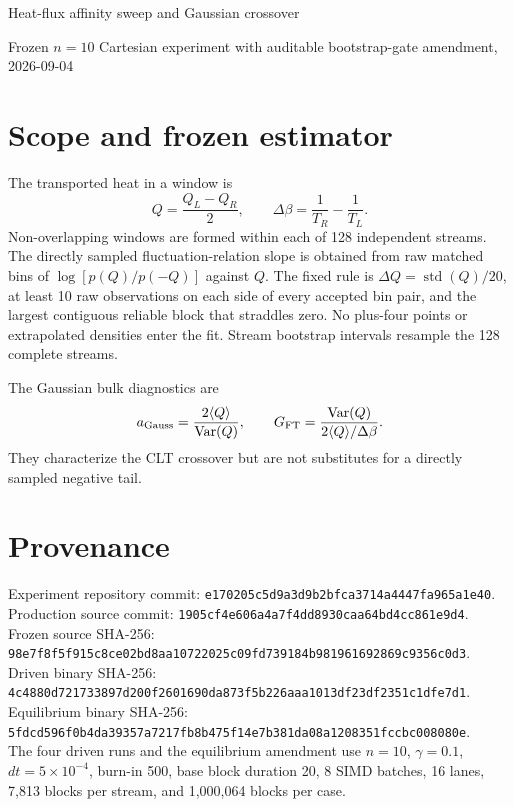 \documentclass[10pt]{article}
\begin{document}
\begin{center}
{\Large Heat-flux affinity sweep and Gaussian crossover}\par
\vspace{0.3em}
{\small Frozen $n=10$ Cartesian experiment with auditable bootstrap-gate amendment, 2026-09-04}
\end{center}

\section*{Scope and frozen estimator}
The transported heat in a window is
\[
Q=\frac{Q_L-Q_R}{2},\qquad
\Delta\beta=\frac{1}{T_R}-\frac{1}{T_L}.
\]
Non-overlapping windows are formed within each of 128 independent streams.
The directly sampled fluctuation-relation slope is obtained from raw matched
bins of $\log[p(Q)/p(-Q)]$ against $Q$.  The fixed rule is
$\Delta Q=\operatorname{std}(Q)/20$, at least 10 raw observations on each
side of every accepted bin pair, and the largest contiguous reliable block
that straddles zero.  No plus-four points or extrapolated densities enter the
fit.  Stream bootstrap intervals resample the 128 complete streams.

The Gaussian bulk diagnostics are
\[
a_{\rm Gauss}=\frac{2\langle Q\rangle}{\operatorname{Var}(Q)},\qquad
G_{\rm FT}=\frac{\operatorname{Var}(Q)}{2\langle Q\rangle/\Delta\beta}.
\]
They characterize the CLT crossover but are not substitutes for a directly
sampled negative tail.

\section*{Provenance}
Experiment repository commit: \nolinkurl{e170205c5d9a3d9b2bfca3714a4447fa965a1e40}.\\
Production source commit: \nolinkurl{1905cf4e606a4a7f4dd8930caa64bd4cc861e9d4}.\\
Frozen source SHA-256: \nolinkurl{98e7f8f5f915c8ce02bd8aa10722025c09fd739184b981961692869c9356c0d3}.\\
Driven binary SHA-256: \nolinkurl{4c4880d721733897d200f2601690da873f5b226aaa1013df23df2351c1dfe7d1}.\\
Equilibrium binary SHA-256: \nolinkurl{5fdcd596f0b4da39357a7217fb8b475f14e7b381da08a1208351fccbc008080e}.\\

The four driven runs and the equilibrium amendment use $n=10$, $\gamma=0.1$, $dt=5\times10^{-4}$, burn-in 500, base block duration 20, 8 SIMD batches, 16 lanes, 7,813 blocks per stream, and 1,000,064 blocks per case.
\end{document}
